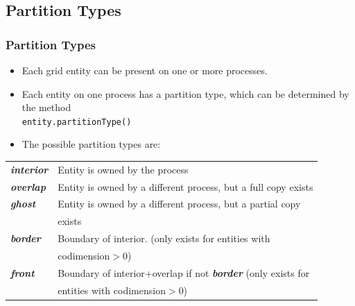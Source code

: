 \documentclass[aspectratio=169,11pt]{beamer}
\theoremstyle{definition}
\begin{document}
\subsection{Partition Types}
\begin{frame}[fragile]
\frametitle<presentation>{Partition Types}

\begin{itemize}
\item Each grid entity can be present on one or more processes.
\item Each entity on one process has a partition type, which can be determined
by the method\\
        \hspace*{1cm}\lstinline!entity.partitionType()!
\item The possible partition types are:\\
\end{itemize}
\begin{tabular}{ll}
  \em \bfseries interior
  & Entity is owned by the process\\
  \em \bfseries overlap & Entity is owned by a different process, but a full copy exists\\
  \em \bfseries ghost
  & Entity is owned by a different process, but a partial copy\\
  & exists\\
  \em \bfseries border
  & Boundary of interior. (only exists for entities with \\
  & codimension$>$0)\\
  \em \bfseries front
  & Boundary of interior+overlap if not {\em \bfseries border} (only exists for\\
  & entities with codimension$>$0)
\end{tabular}
\end{frame}
\end{document}
